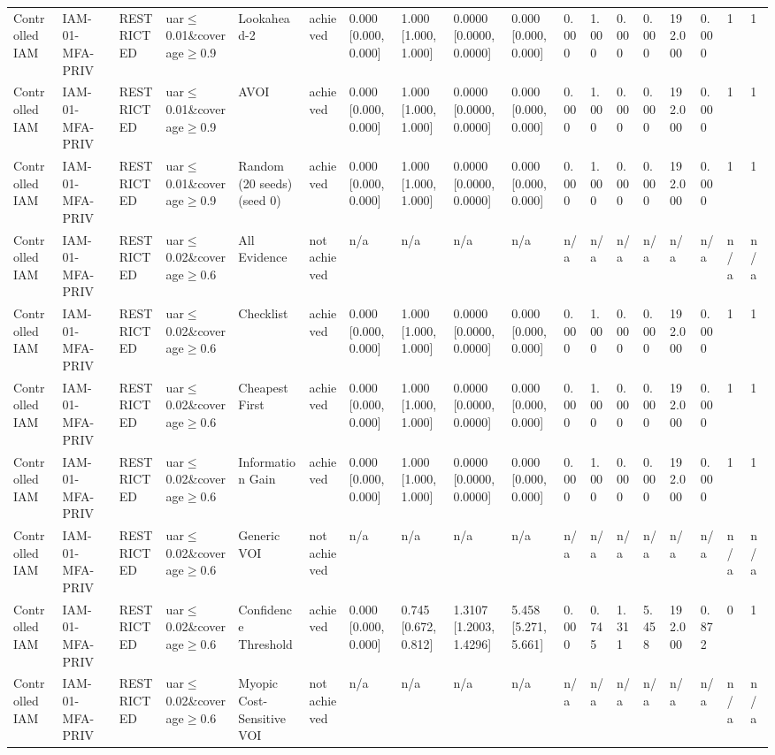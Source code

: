 \begin{table}[!ht]
{\begin{tabular}{llllllllllllllllll}
Controlled IAM & IAM-01-MFA-PRIV & RESTRICTED & uar$\le$0.01\&coverage$\ge$0.9 & Lookahead-2 & achieved & 0.000 [0.000, 0.000] & 1.000 [1.000, 1.000] & 0.0000 [0.0000, 0.0000] & 0.000 [0.000, 0.000] & 0.000 & 1.000 & 0.000 & 0.000 & 192.000 & 0.000 & 1 & 1 \\
Controlled IAM & IAM-01-MFA-PRIV & RESTRICTED & uar$\le$0.01\&coverage$\ge$0.9 & AVOI & achieved & 0.000 [0.000, 0.000] & 1.000 [1.000, 1.000] & 0.0000 [0.0000, 0.0000] & 0.000 [0.000, 0.000] & 0.000 & 1.000 & 0.000 & 0.000 & 192.000 & 0.000 & 1 & 1 \\
Controlled IAM & IAM-01-MFA-PRIV & RESTRICTED & uar$\le$0.01\&coverage$\ge$0.9 & Random (20 seeds) (seed 0) & achieved & 0.000 [0.000, 0.000] & 1.000 [1.000, 1.000] & 0.0000 [0.0000, 0.0000] & 0.000 [0.000, 0.000] & 0.000 & 1.000 & 0.000 & 0.000 & 192.000 & 0.000 & 1 & 1 \\
Controlled IAM & IAM-01-MFA-PRIV & RESTRICTED & uar$\le$0.02\&coverage$\ge$0.6 & All Evidence & not achieved & n/a & n/a & n/a & n/a & n/a & n/a & n/a & n/a & n/a & n/a & n/a & n/a \\
Controlled IAM & IAM-01-MFA-PRIV & RESTRICTED & uar$\le$0.02\&coverage$\ge$0.6 & Checklist & achieved & 0.000 [0.000, 0.000] & 1.000 [1.000, 1.000] & 0.0000 [0.0000, 0.0000] & 0.000 [0.000, 0.000] & 0.000 & 1.000 & 0.000 & 0.000 & 192.000 & 0.000 & 1 & 1 \\
Controlled IAM & IAM-01-MFA-PRIV & RESTRICTED & uar$\le$0.02\&coverage$\ge$0.6 & Cheapest First & achieved & 0.000 [0.000, 0.000] & 1.000 [1.000, 1.000] & 0.0000 [0.0000, 0.0000] & 0.000 [0.000, 0.000] & 0.000 & 1.000 & 0.000 & 0.000 & 192.000 & 0.000 & 1 & 1 \\
Controlled IAM & IAM-01-MFA-PRIV & RESTRICTED & uar$\le$0.02\&coverage$\ge$0.6 & Information Gain & achieved & 0.000 [0.000, 0.000] & 1.000 [1.000, 1.000] & 0.0000 [0.0000, 0.0000] & 0.000 [0.000, 0.000] & 0.000 & 1.000 & 0.000 & 0.000 & 192.000 & 0.000 & 1 & 1 \\
Controlled IAM & IAM-01-MFA-PRIV & RESTRICTED & uar$\le$0.02\&coverage$\ge$0.6 & Generic VOI & not achieved & n/a & n/a & n/a & n/a & n/a & n/a & n/a & n/a & n/a & n/a & n/a & n/a \\
Controlled IAM & IAM-01-MFA-PRIV & RESTRICTED & uar$\le$0.02\&coverage$\ge$0.6 & Confidence Threshold & achieved & 0.000 [0.000, 0.000] & 0.745 [0.672, 0.812] & 1.3107 [1.2003, 1.4296] & 5.458 [5.271, 5.661] & 0.000 & 0.745 & 1.311 & 5.458 & 192.000 & 0.872 & 0 & 1 \\
Controlled IAM & IAM-01-MFA-PRIV & RESTRICTED & uar$\le$0.02\&coverage$\ge$0.6 & Myopic Cost-Sensitive VOI & not achieved & n/a & n/a & n/a & n/a & n/a & n/a & n/a & n/a & n/a & n/a & n/a & n/a \\

\end{tabular}}
\end{table}
